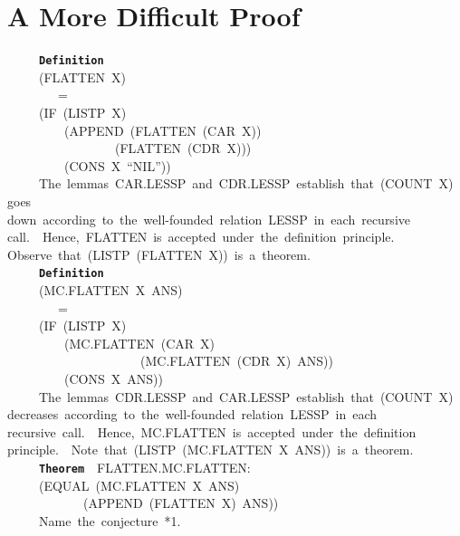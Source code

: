 \documentclass[11pt]{book}
\newenvironment{pubasis}{\begin{flushleft}\ttfamily\small}{\normalsize\rmfamily\end{flushleft}}
\newcommand{\axiomordefinition}[1]{\vspace{6pt}\texttt{\textbf{#1}}}
\newcommand{\pubdefaulttextsize}{\large}
\begin{document}
\section{A More Difficult Proof}
\pubdefaulttextsize
\begin{pubasis}
~~~~~\axiomordefinition{Definition}\\
~~~~~(FLATTEN~X)\\
~~~~~~~~=\\
~~~~~(IF~(LISTP~X)\\
~~~~~~~~~(APPEND~(FLATTEN~(CAR~X))\\
~~~~~~~~~~~~~~~~~(FLATTEN~(CDR~X)))\\
~~~~~~~~~(CONS~X~``NIL''))\\

~~~~~The~lemmas~CAR.LESSP~and~CDR.LESSP~establish~that~(COUNT~X)~goes\\
down~according~to~the~well-founded~relation~LESSP~in~each~recursive\\
call.~~Hence,~FLATTEN~is~accepted~under~the~definition~principle.\\
Observe~that~(LISTP~(FLATTEN~X))~is~a~theorem.\\

~~~~~\axiomordefinition{Definition}\\
~~~~~(MC.FLAT\-TEN~X~ANS)\\
~~~~~~~~=\\
~~~~~(IF~(LISTP~X)\\
~~~~~~~~~(MC.FLAT\-TEN~(CAR~X)\\
~~~~~~~~~~~~~~~~~~~~~(MC.FLAT\-TEN~(CDR~X)~ANS))\\
~~~~~~~~~(CONS~X~ANS))\\

~~~~~The~lemmas~CDR.LESSP~and~CAR.LESSP~establish~that~(COUNT~X)\\
decreases~according~to~the~well-founded~relation~LESSP~in~each\\
recursive~call.~~Hence,~MC.FLAT\-TEN~is~accepted~under~the~definition\\
principle.~~Note~that~(LISTP~(MC.FLAT\-TEN~X~ANS))~is~a~theorem.\\

~~~~~\axiomordefinition{Theorem}~~FLAT\-TEN.MC.FLAT\-TEN:\\
~~~~~(EQUAL~(MC.FLAT\-TEN~X~ANS)\\
~~~~~~~~~~~~(APPEND~(FLATTEN~X)~ANS))\\

~~~~~Name~the~conjecture~*1.\\


\end{pubasis}
\end{document}
